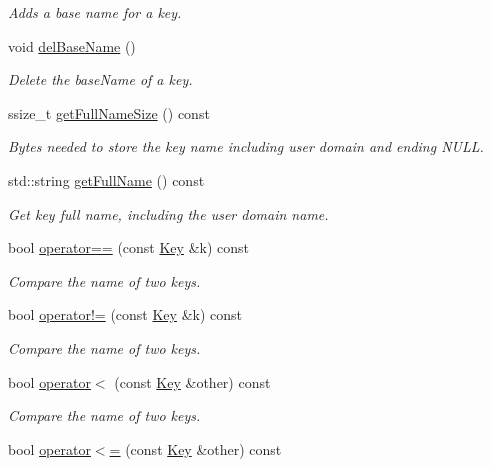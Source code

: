 \begin{DoxyCompactItemize}
\begin{DoxyCompactList}\small\item\em Adds a base name for a key. \end{DoxyCompactList}\item 
void \hyperlink{classkdb_1_1Key_aec6af8723a31af40f9a16614ea46c341}{del\+Base\+Name} ()
\begin{DoxyCompactList}\small\item\em Delete the base\+Name of a key. \end{DoxyCompactList}\item 
ssize\+\_\+t \hyperlink{classkdb_1_1Key_a92d6ec8adb547051b2861749e25e954e}{get\+Full\+Name\+Size} () const
\begin{DoxyCompactList}\small\item\em Bytes needed to store the key name including user domain and ending N\+U\+LL. \end{DoxyCompactList}\item 
std\+::string \hyperlink{classkdb_1_1Key_aae77aecb3dece445f103b3ce81b02515}{get\+Full\+Name} () const
\begin{DoxyCompactList}\small\item\em Get key full name, including the user domain name. \end{DoxyCompactList}\item 
bool \hyperlink{classkdb_1_1Key_ae52e7f4c4461db5356ddeef64a870cad}{operator==} (const \hyperlink{classkdb_1_1Key}{Key} \&k) const
\begin{DoxyCompactList}\small\item\em Compare the name of two keys. \end{DoxyCompactList}\item 
bool \hyperlink{classkdb_1_1Key_a7cf40dd6e79e63765c9535a8fcee6491}{operator!=} (const \hyperlink{classkdb_1_1Key}{Key} \&k) const
\begin{DoxyCompactList}\small\item\em Compare the name of two keys. \end{DoxyCompactList}\item 
bool \hyperlink{classkdb_1_1Key_aae9d359b54dc0df7d7b3ab3755a09732}{operator$<$} (const \hyperlink{classkdb_1_1Key}{Key} \&other) const
\begin{DoxyCompactList}\small\item\em Compare the name of two keys. \end{DoxyCompactList}\item 
bool \hyperlink{classkdb_1_1Key_addb92d7d52f80fc0cafa40d60fe0564f}{operator$<$=} (const \hyperlink{classkdb_1_1Key}{Key} \&other) const

\end{DoxyCompactItemize}
